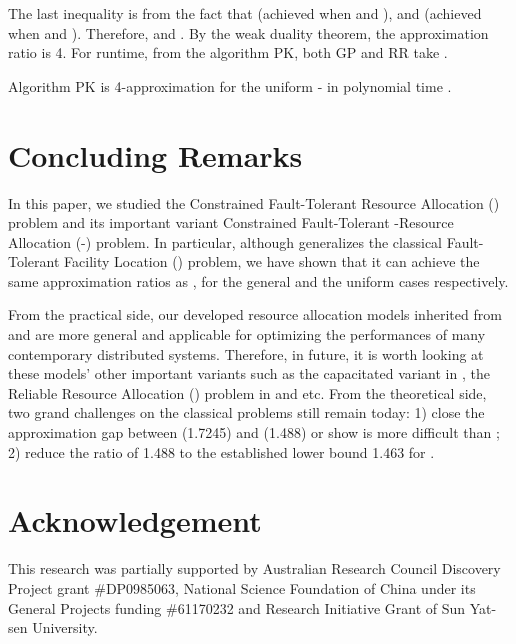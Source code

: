 \documentclass[10pt]{llncs}
\begin{document}
The last inequality is from the fact that 
(achieved when  and ), and 
(achieved when  and ). Therefore, 
and .
By the weak duality theorem, the approximation ratio is 4. For runtime,
from the algorithm PK, both GP and RR take . 
\begin{theorem}
Algorithm PK is 4-approximation for the uniform - in polynomial
time .
\end{theorem}

\section{Concluding Remarks}

In this paper, we studied the Constrained Fault-Tolerant Resource
Allocation () problem and its important variant Constrained
Fault-Tolerant -Resource Allocation (-) problem. In
particular, although  generalizes the classical Fault-Tolerant
Facility Location () problem, we have shown that it can achieve
the same approximation ratios as , for the general and the
uniform cases respectively. 

From the practical side, our developed resource allocation models
inherited from  and  are more general and applicable
for optimizing the performances of many contemporary distributed systems.
Therefore, in future, it is worth looking at these models' other important
variants such as the capacitated variant in \cite{kewen2011cocoon},
the Reliable Resource Allocation () problem in \cite{kewen2012cats}
and etc. From the theoretical side, two grand challenges on the classical
problems still remain today: 1) close the approximation gap between
 (1.7245) and  (1.488) or show  is more difficult
than ; 2) reduce the ratio of 1.488 to the established lower
bound 1.463 for .

\section*{Acknowledgement} This research was partially supported by Australian Research Council Discovery Project grant \#DP0985063, National Science Foundation of China under its General Projects funding \#61170232 and Research Initiative Grant of Sun Yat-sen University.

 

\end{document}
